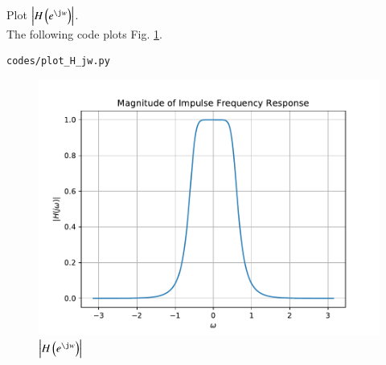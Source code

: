 \documentclass[journal,12pt,twocolumn]{IEEEtran}
\renewcommand\thesection{\arabic{section}}
\begin{document}
\begin{enumerate}[label=\thesection.\arabic*,ref=\thesection.\theenumi]
Plot $\abs{H\brak{e^{\j w}}}$.
\\
\solution
The following code plots Fig. \ref{fig:H(jw)}.
\begin{lstlisting}
codes/plot_H_jw.py
\end{lstlisting}
\begin{figure}[!ht]
\centering
\includegraphics[width=\columnwidth]{./figs/mag_H(jw)}
\caption{$\abs{H\brak{e^{\j w}}}$}
\label{fig:H(jw)}
\end{figure}
\end{enumerate}
\end{document}
